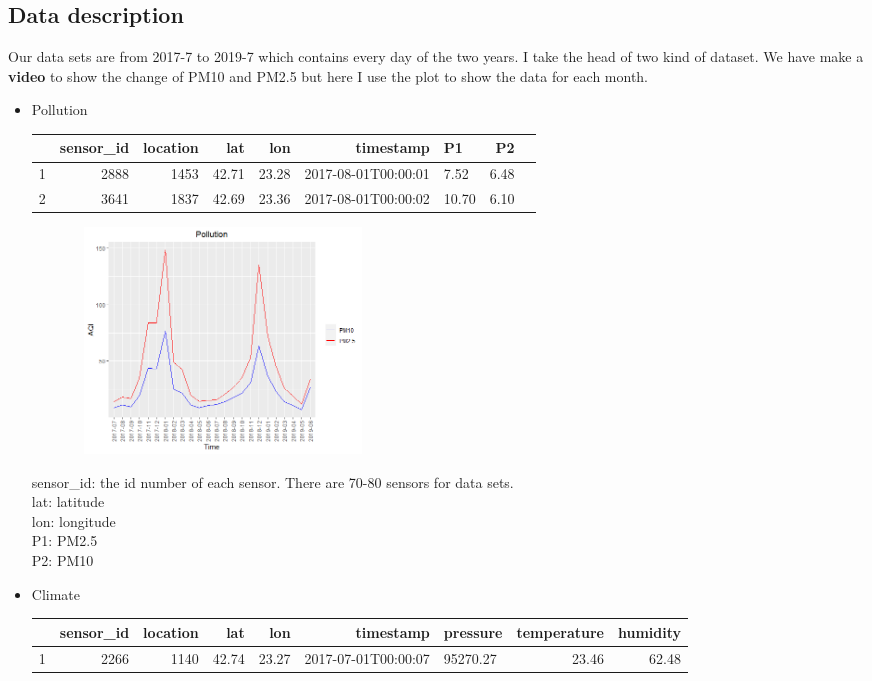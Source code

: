 \documentclass{article}
\begin{document}
\subsection{\textbf{Data description}}
Our data sets are from 2017-7 to 2019-7 which contains every day of the two years. I take the head of two kind of dataset. We have make a \textbf{video} to show the change of PM10 and PM2.5 but here I use the plot to show the data for each month.
\begin{itemize}
    \item Pollution
    \begin{table}[ht]
    \centering
    \begin{tabular}{rrrrrrlrr}
    \hline
      & sensor\_id & location & lat & lon & timestamp & P1 & P2 \\ 
  \hline
1  & 2888 & 1453 & 42.71 & 23.28 & 2017-08-01T00:00:01 & 7.52 & 6.48 \\ 
  2  & 3641 & 1837 & 42.69 & 23.36 & 2017-08-01T00:00:02 & 10.70 & 6.10 \\ 
   \hline
\end{tabular}
\end{table}
\begin{figure}[ht]
	\centering
	\includegraphics[width=8cm,height=6cm]{p1.png}
\end{figure}
sensor\_id: the id number of each sensor. There are 70-80 sensors for data sets.\\
lat: latitude\\
lon: longitude\\
P1: PM2.5\\
P2: PM10
    \item Climate
    \begin{table}[ht]
\centering
\begin{tabular}{rrrrrrlrr}
  \hline
  & sensor\_id & location & lat & lon & timestamp & pressure & temperature & humidity \\ 
  \hline
1  & 2266 & 1140 & 42.74 & 23.27 & 2017-07-01T00:00:07 & 95270.27 & 23.46 & 62.48 \\ 

\end{tabular}
\end{table}
\end{itemize}
\end{document}

